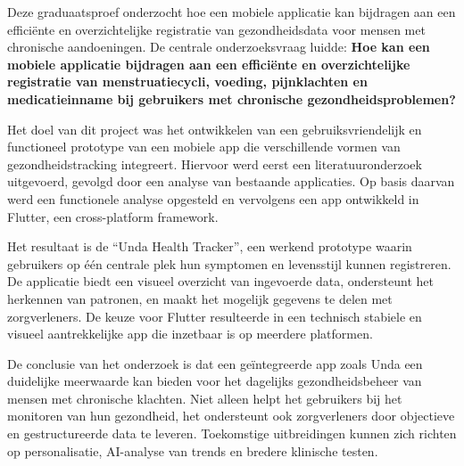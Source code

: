 Deze graduaatsproef onderzocht hoe een mobiele applicatie kan bijdragen aan een efficiënte en overzichtelijke registratie van gezondheidsdata voor mensen met chronische aandoeningen. De centrale onderzoeksvraag luidde: \textbf{Hoe kan een mobiele applicatie bijdragen aan een efficiënte en overzichtelijke registratie van menstruatiecycli, voeding, pijnklachten en medicatieinname bij gebruikers met chronische gezondheidsproblemen?}

Het doel van dit project was het ontwikkelen van een gebruiksvriendelijk en functioneel prototype van een mobiele app die verschillende vormen van gezondheidstracking integreert. Hiervoor werd eerst een literatuuronderzoek uitgevoerd, gevolgd door een analyse van bestaande applicaties. Op basis daarvan werd een functionele analyse opgesteld en vervolgens een app ontwikkeld in Flutter, een cross-platform framework.

Het resultaat is de “Unda Health Tracker”, een werkend prototype waarin gebruikers op één centrale plek hun symptomen en levensstijl kunnen registreren. De applicatie biedt een visueel overzicht van ingevoerde data, ondersteunt het herkennen van patronen, en maakt het mogelijk gegevens te delen met zorgverleners. De keuze voor Flutter resulteerde in een technisch stabiele en visueel aantrekkelijke app die inzetbaar is op meerdere platformen.

De conclusie van het onderzoek is dat een geïntegreerde app zoals Unda een duidelijke meerwaarde kan bieden voor het dagelijks gezondheidsbeheer van mensen met chronische klachten. Niet alleen helpt het gebruikers bij het monitoren van hun gezondheid, het ondersteunt ook zorgverleners door objectieve en gestructureerde data te leveren. Toekomstige uitbreidingen kunnen zich richten op personalisatie, AI-analyse van trends en bredere klinische testen.


